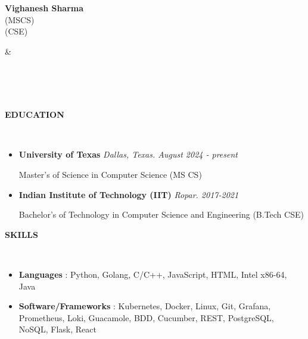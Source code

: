 \documentclass[a4paper,10pt]{article}
\newcommand{\lsep}{-0.6cm}
\newcommand{\resheading}[1]{{\small \colorbox{mygrey}{\begin{minipage}{0.975\textwidth}{\textbf{#1 \vphantom{p\^{E}}}}\end{minipage}}}}
\begin{document}

\begin{minipage}{0.5\linewidth}
\textbf{\Large Vighanesh Sharma}\\
 (MSCS)\\
 (CSE)\\
\end{minipage}
&\hspace{2.5cm}
\begin{minipage}{0.5\linewidth}
\\
\\
 \\
\end{minipage}
\vspace{-5.0pt}


\resheading{\textbf{EDUCATION} }\\[\lsep]
\vspace{1.0pt}
\begin{itemize}
\item \textbf{University of Texas} \hfill \emph{Dallas, Texas. August 2024 - present}
\setlength{\itemsep}{1pt}
\setlength{\parskip}{0pt}
\setlength{\parsep}{0pt}

Master's of Science in Computer Science (MS CS)

\item \textbf{Indian Institute of Technology (IIT)} \hfill \emph{Ropar. 2017-2021}
\setlength{\itemsep}{1pt}
\setlength{\parskip}{0pt}
\setlength{\parsep}{0pt}

Bachelor's of Technology in Computer Science and Engineering (B.Tech CSE)

\end{itemize}
\vspace{-5pt}

\resheading{\textbf{SKILLS} }\\[\lsep]
\vspace{1.0pt}
\begin{itemize}[itemsep=0.1pt]

\item \noindent \textbf{Languages} : Python, Golang, C/C++, JavaScript, HTML, Intel x86-64, Java
\item \noindent \textbf{Software/Frameworks} : Kubernetes, Docker, Linux, Git, Grafana, Prometheus, Loki, Guacamole, BDD, Cucumber, REST, PostgreSQL, NoSQL, Flask, React
\end{itemize}
\vspace{-5pt}
\end{document}
